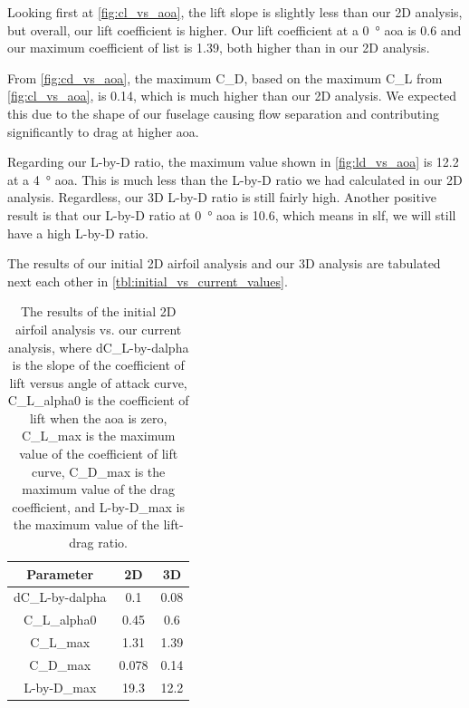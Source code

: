 Looking first at \autoref{fig:cl_vs_aoa}, the lift slope is slightly less than our 2D analysis, but overall, our lift coefficient is higher. Our lift coefficient at a \qty{0}{\degree} \acrshort{aoa} is \num{0.6} and our maximum coefficient of list is \num{1.39}, both higher than in our 2D analysis.

From \autoref{fig:cd_vs_aoa}, the maximum \gls{C_D}, based on the maximum \gls{C_L} from \autoref{fig:cl_vs_aoa}, is \num{0.14}, which is much higher than our 2D analysis. We expected this due to the shape of our fuselage causing flow separation and contributing significantly to drag at higher \acrshort{aoa}.

Regarding our \gls{L-by-D} ratio, the maximum value shown in \autoref{fig:ld_vs_aoa} is \num{12.2} at a \qty{4}{\degree} \acrshort{aoa}. This is much less than the \gls{L-by-D} ratio we had calculated in our 2D analysis. Regardless, our 3D \gls{L-by-D} ratio is still fairly high. Another positive result is that our \gls{L-by-D} ratio at \qty{0}{\degree} \acrshort{aoa} is \num{10.6}, which means in \acrfull{slf}, we will still have a high \gls{L-by-D} ratio. 

The results of our initial 2D airfoil analysis and our 3D analysis are tabulated next each other in \autoref{tbl:initial_vs_current_values}.

\begin{table}[htpb]
    \centering
    \caption[2D airfoil analysis vs. current analysis]{The results of the initial 2D airfoil analysis vs. our current analysis, where \gls{dC_L-by-dalpha} is the slope of the coefficient of lift versus angle of attack curve, \gls{C_L_alpha0} is the coefficient of lift when the \acrshort{aoa} is zero, \gls{C_L_max} is the maximum value of the coefficient of lift curve, \gls{C_D_max} is the maximum value of the drag coefficient, and \gls{L-by-D_max} is the maximum value of the lift-drag ratio.}
    \begin{tabular}{ccc}
        \toprule
        \textbf{Parameter} & \textbf{2D} & \textbf{3D} \\
        \midrule
        \gls{dC_L-by-dalpha} & \num{0.1} & \num{0.08} \\
        \gls{C_L_alpha0} & \num{0.45} & \num{0.6} \\
        \gls{C_L_max} & \num{1.31} & \num{1.39} \\
        \gls{C_D_max} & \num{0.078} & \num{0.14} \\
        \gls{L-by-D_max} & \num{19.3} & \num{12.2} \\
        \bottomrule
    \end{tabular}
    \label{tbl:initial_vs_current_values}
\end{table}

